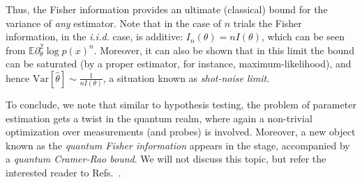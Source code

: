 Thus, the Fisher information provides an ultimate (classical) bound for the variance of \textit{any} estimator. Note that in the case of $n$ trials the Fisher information, in the \textit{i.i.d.} case, is additive: $I_n(\theta) = n I(\theta)$, which can be seen from  $\mathbb{E} \partial_\theta^2 \log p(x)^n$.
Moreover, it can also be shown that in this limit the bound can be saturated (by a proper estimator, for instance, maximum-likelihood), and hence $\text{Var}[\hat{\theta}]\sim \tfrac{1}{n I(\theta)}$, a situation known as \textit{shot-noise limit}.

To conclude, we note that similar to hypothesis testing, the problem of parameter estimation gets a twist in the quantum realm, where again a non-trivial optimization over measurements (and probes) is involved. Moreover, a new object known as the \textit{quantum Fisher information} appears in the stage, accompanied by a \textit{quantum Cramer-Rao bound}. We will not discuss this topic, but refer the interested reader to Refs.~\cite{Meyer2021fisherinformationin,helstromBOOK,giovanetti2006quatnum}.
